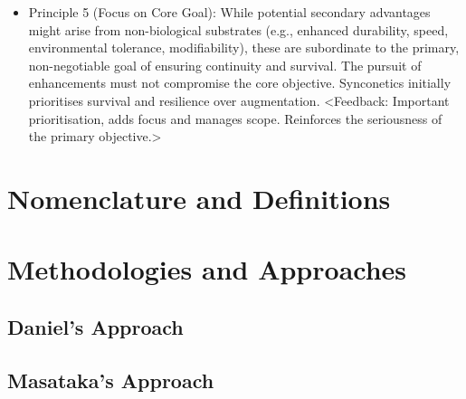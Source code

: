 \documentclass[10pt]{article}
\begin{document}
\begin{sloppypar}
\begin{itemize}
    \item Principle 5 (Focus on Core Goal): While potential secondary advantages might arise from non-biological substrates (e.g., enhanced durability, speed, environmental tolerance, modifiability), these are subordinate to the primary, non-negotiable goal of ensuring continuity and survival. The pursuit of enhancements must not compromise the core objective. Synconetics initially prioritises survival and resilience over augmentation. <Feedback: Important prioritisation, adds focus and manages scope. Reinforces the seriousness of the primary objective.>

  \end{itemize}


  \section{Nomenclature and Definitions}
  \label{sec:nomenclature}



  \section{Methodologies and Approaches}
  \label{sec:methodologies}


  \subsection{Daniel's Approach}
  \label{sec:daniel-approach}


  \subsection{Masataka's Approach}
  \label{sec:masataka-approach}


\end{sloppypar}
\end{document}
